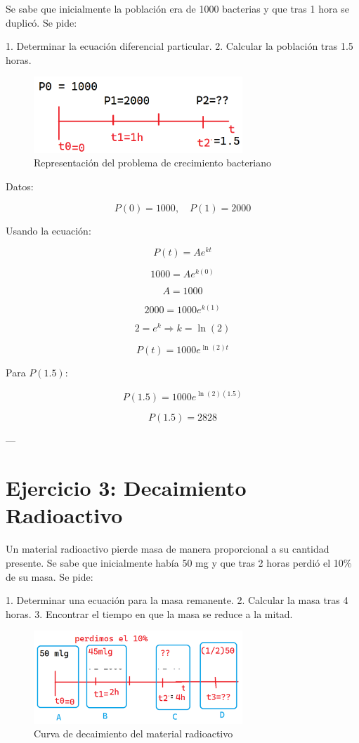 Se sabe que inicialmente la población era de 1000 bacterias y que tras 1 hora se duplicó. Se pide:

1. Determinar la ecuación diferencial particular.
2. Calcular la población tras 1.5 horas.

\begin{figure}[H]
    \centering
    \includegraphics[width=0.7\textwidth]{images/Modelado 04.png}
    \caption{Representación del problema de crecimiento bacteriano}
\end{figure}

Datos:

\[
P(0) = 1000, \quad P(1) = 2000
\]

Usando la ecuación:

\[
P(t) = A e^{kt}
\]

\[
1000 = A e^{k(0)}
\]

\[
A = 1000
\]

\[
2000 = 1000 e^{k(1)}
\]

\[
2 = e^k \Rightarrow k = \ln(2)
\]

\[
P(t) = 1000 e^{\ln(2) t}
\]

Para \( P(1.5) \):

\[
P(1.5) = 1000 e^{\ln(2)(1.5)}
\]

\[
P(1.5) = 2828
\]

---

\section*{Ejercicio 3: Decaimiento Radioactivo}

Un material radioactivo pierde masa de manera proporcional a su cantidad presente. Se sabe que inicialmente había 50 mg y que tras 2 horas perdió el 10\% de su masa. Se pide:

1. Determinar una ecuación para la masa remanente.
2. Calcular la masa tras 4 horas.
3. Encontrar el tiempo en que la masa se reduce a la mitad.

\begin{figure}[H]
    \centering
    \includegraphics[width=0.7\textwidth]{images/Modelado 05.png}
    \caption{Curva de decaimiento del material radioactivo}
\end{figure}


